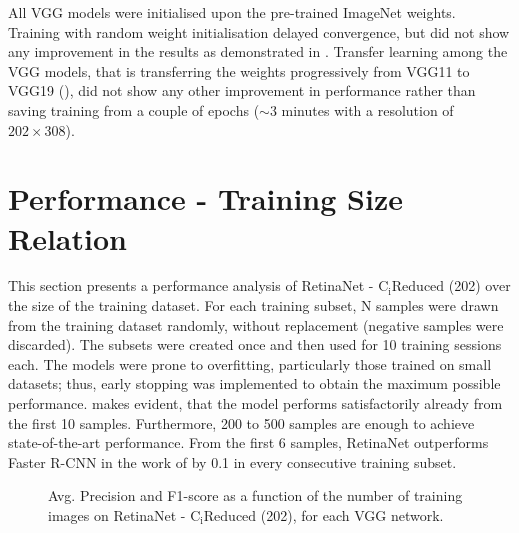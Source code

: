 All VGG models were initialised upon the pre-trained ImageNet weights. Training with random weight initialisation delayed convergence, but did not show any improvement in the results as demonstrated in \cite{bargoti2017deep}. Transfer learning among the VGG models, that is transferring the weights progressively from VGG11 to VGG19 (\cite{simonyan2014very}), did not show any other improvement in performance rather than saving training from a couple of epochs ($\sim3$ minutes with a resolution of $202\times308$).


\section{Performance - Training Size Relation}
This section presents a performance analysis of RetinaNet - $\text{C}_\text{i}\text{Reduced}$ (202)	over the size of the training dataset. For each training subset, N samples were drawn from the training dataset randomly, without replacement (negative samples were discarded). The subsets were created once and then used for 10 training sessions each. The models were prone to overfitting, particularly those trained on small datasets; thus, early stopping was implemented to obtain the maximum possible performance.  makes evident, that the model performs satisfactorily already from the first 10 samples. Furthermore, 200 to 500 samples are enough to achieve state-of-the-art performance. From the first 6 samples, RetinaNet outperforms Faster R-CNN in the work of \cite{bargoti2017deep} by 0.1 in every consecutive training subset.

 \begin{figure}[!htb]
  \centering
  \caption{Avg. Precision and F1-score as a function of the number of training images on RetinaNet - $\text{C}_\text{i}\text{Reduced}$ (202), for each VGG network.}
  \label{fig9}
\end{figure}


